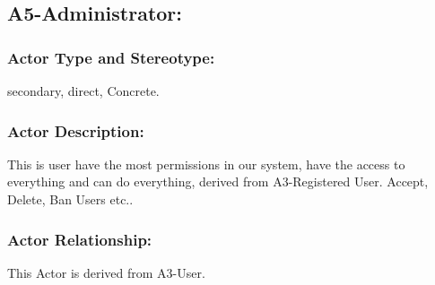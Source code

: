 \documentclass[11pt, openany]{report}
\begin{document}

\clearpage

\subsection{A5-Administrator:}
\label{A5}
\subsubsection{Actor Type and Stereotype:}
secondary, direct, Concrete.
\subsubsection{Actor Description:}
This is user have the most permissions in our system, have the access to everything and can do everything, derived from A3-Registered User.
Accept, Delete, Ban Users etc..
\subsubsection{Actor Relationship:}

This Actor is derived from A3-User.
\end{document}
